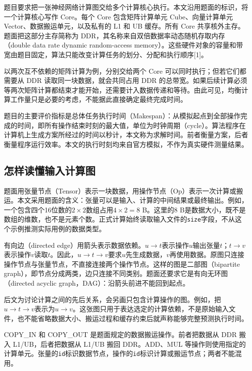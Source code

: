 \documentclass[anonymous,notoc]{gmcm2026}
\begin{document}
题目要求把一张神经网络计算图交给多个计算核心执行。本文沿用题面的标识，将一个计算核心写作 Core。每个 Core 包含矩阵计算单元 Cube、向量计算单元 Vector、数据搬运单元，以及私有的 L1 和 UB 缓存。所有 Core 共享核外主存。题面把这部分主存简称为 DDR，其名称来自双倍数据率动态随机存取内存（double data rate dynamic random-access memory）。这些硬件对象的容量和带宽由题目固定，算法只能改变计算任务的划分、分配和执行顺序{[}1{]}。

以两次互不依赖的矩阵计算为例，分别交给两个 Core 可以同时执行；但若它们都需要从 DDR 读取同一块数据，就会共同占用 DDR 的总带宽。如果后续计算必须等两次矩阵计算都结束才能开始，还需要计入数据传递和等待。由此可见，均衡计算工作量只是必要的考虑，不能据此直接确定最终完成时间。

题目的主要评价指标是总体任务执行时间（Makespan）：从模拟起点到全部操作完成的时间，即所有操作结束时刻的最大值，单位为时钟周期（cycle）。算法程序在计算机上生成方案所经过的时间以秒计，本文称为求解时间。前者衡量方案，后者衡量程序运行效率。本文的执行时刻均来自官方模拟，不作为真实硬件测量结果。

\subsection{怎样读懂输入计算图}

题面用张量节点（Tensor）表示一块数据，用操作节点（Op）表示一次计算或搬运。本文采用题面的含义：张量可以是输入、计算的中间结果或最终输出。例如，一个包含四个16位数的\(2\times2\)数组占用\(4\times2=8\) B。这里的8 B是数据大小，既不是数组的维数，也不是元素个数。正式计算始终读取输入文件的\texttt{size}字段，不从这个示例推测实际用例的数据类型。

有向边（directed edge）用箭头表示数据依赖。\(u\to t\)表示操作\(u\)输出张量\(t\)；\(t\to v\)表示操作\(v\)读取\(t\)。因此，\(u\to t\to v\)要求\(u\)先生成数据，\(v\)再使用数据。原图只连接操作节点与张量节点，不直接连接两个操作节点。这样的图是二部图（bipartite graph），即节点分成两类，边只连接不同类别。题面还要求它是有向无环图（directed acyclic graph，DAG）：沿箭头前进不能回到起点。

后文为讨论计算之间的先后关系，会另画只包含计算操作的图。例如，把\(u\to t\to v\)表示为\(u\to v\)。这张图只用于表达选定的计算依赖，不是原始输入文件，也不能省略数据大小、搬运过程和缓存约束后就声称能够完整预测执行时间。

COPY\_IN 和 COPY\_OUT 是题面规定的数据搬运操作。前者把数据从 DDR 搬入 L1/UB，后者把数据从 L1/UB 搬回 DDR。ADD、MUL 等操作则使用指定的计算单元。张量的\texttt{id}标识数据节点，操作的\texttt{id}标识计算或搬运节点；两者不能混用。
\end{document}
